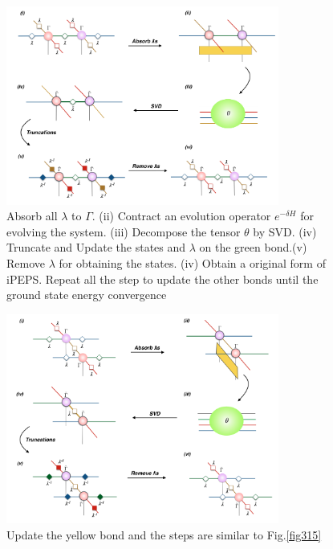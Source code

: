 \begin{figure}[ht]
	\centering
	\includegraphics[width=0.80\textwidth]{figures/fig315.png}
	\caption[The tensor network diagrams of updating the green bond in iPEPS with 2D-iTEBD]{Absorb all $\lambda$ to $\Gamma$. (ii) Contract an evolution operator $e^{-\delta H}$ for evolving the system. (iii) Decompose the tensor $\theta$ by SVD. (iv) Truncate and Update the states and $\lambda$ on the green bond.(v) Remove $\lambda$ for obtaining the states. (iv) Obtain a original form of iPEPS. Repeat all the step to update the other bonds until the ground state energy convergence}
	\label{fig316}
\end{figure}

	\begin{figure}[ht]
	\centering
	\includegraphics[width=0.80\textwidth]{figures/fig316.png}
	\caption[The tensor network diagrams of updating the yellow bond in iPEPS with 2D-iTEBD]{Update the yellow bond and the steps are similar to Fig.\ref{fig315}}
	\label{fig316}
	\end{figure}

